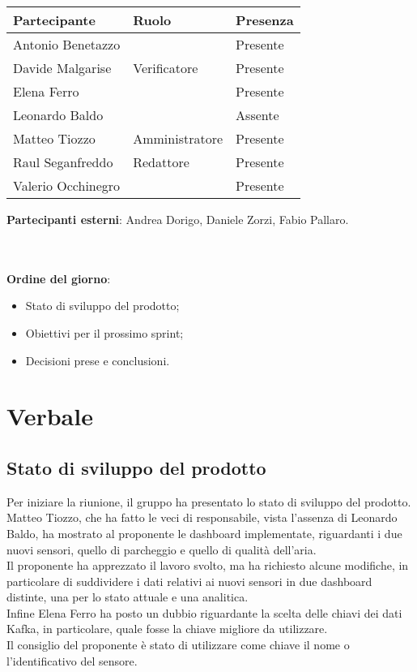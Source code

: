 \documentclass[italian,12pt]{article}
\begin{document}
\begin{flushleft}
	\begin{table}[!h]
		\begin{tabular}{ |l|l|l| }
			\hline
			\textbf{Partecipante} & \textbf{Ruolo} & \textbf{Presenza} \\
			\hline
			Antonio Benetazzo     &                & Presente          \\
			Davide Malgarise      & Verificatore   & Presente          \\
			Elena Ferro           & 			   & Presente          \\
			Leonardo Baldo        & 			   & Assente           \\
			Matteo Tiozzo         & Amministratore & Presente          \\
			Raul Seganfreddo      & Redattore	   & Presente          \\
			Valerio Occhinegro    &                & Presente          \\
			\hline
		\end{tabular}
	\end{table}
	\textbf{Partecipanti esterni}: Andrea Dorigo, Daniele Zorzi, Fabio Pallaro.\\
\end{flushleft}\\
\\
\textbf{Ordine del giorno}:
\begin{itemize}
	\item Stato di sviluppo del prodotto;
	\item Obiettivi per il prossimo sprint;
	\item Decisioni prese e conclusioni.
\end{itemize}

\newpage

\section{Verbale}

\subsection{Stato di sviluppo del prodotto}
Per iniziare la riunione, il gruppo ha presentato lo stato di sviluppo del prodotto.\\
Matteo Tiozzo, che ha fatto le veci di responsabile, vista l'assenza di Leonardo Baldo, ha mostrato al proponente le
dashboard implementate, riguardanti i due nuovi sensori, quello di parcheggio e quello di qualità dell'aria.\\
Il proponente ha apprezzato il lavoro svolto, ma ha richiesto alcune modifiche, in particolare di suddividere
i dati relativi ai nuovi sensori in due dashboard distinte, una per lo stato attuale e una analitica.\\
Infine Elena Ferro ha posto un dubbio riguardante la scelta delle chiavi dei dati Kafka, in particolare, quale fosse
la chiave migliore da utilizzare.\\ Il consiglio del proponente è stato di utilizzare come chiave il nome o
l'identificativo del sensore.
\end{document}
